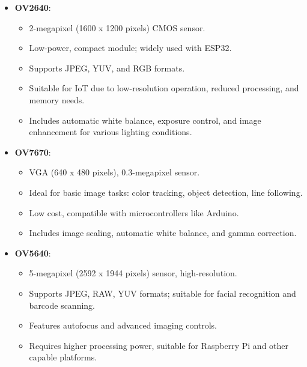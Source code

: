 \begin{itemize}
	\item \textbf{OV2640}:
	\begin{itemize}
		\item 2-megapixel (1600 x 1200 pixels) CMOS sensor.
		\item Low-power, compact module; widely used with ESP32.
		\item Supports JPEG, YUV, and RGB formats.
		\item Suitable for IoT due to low-resolution operation, reduced processing, and memory needs.
		\item Includes automatic white balance, exposure control, and image enhancement for various lighting conditions. \cite{OV2640}
	\end{itemize}
	
	\item \textbf{OV7670}:
	\begin{itemize}
		\item VGA (640 x 480 pixels), 0.3-megapixel sensor.
		\item Ideal for basic image tasks: color tracking, object detection, line following.
		\item Low cost, compatible with microcontrollers like Arduino.
		\item Includes image scaling, automatic white balance, and gamma correction. \cite{OV7670}
	\end{itemize}
	
	\item \textbf{OV5640}:
	\begin{itemize}
		\item 5-megapixel (2592 x 1944 pixels) sensor, high-resolution.
		\item Supports JPEG, RAW, YUV formats; suitable for facial recognition and barcode scanning.
		\item Features autofocus and advanced imaging controls.
		\item Requires higher processing power, suitable for Raspberry Pi and other capable platforms. \cite{OV5640}
	\end{itemize}
\end{itemize}






